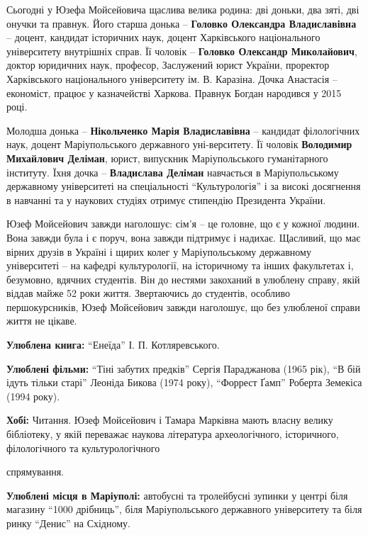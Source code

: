 Сьогодні у Юзефа Мойсейовича щаслива велика родина: дві доньки, два зяті, дві
онучки та правнук. Його старша донька – \textbf{Головко Олександра Владиславівна} –
доцент, кандидат історичних наук, доцент Харківського національного
університету внутрішніх справ. Її чоловік – \textbf{Головко Олександр Миколайович},
доктор юридичних наук, професор, Заслужений юрист України, проректор
Харківського національного університету ім. В. Каразіна. Дочка Анастасія –
економіст, працює у казначействі Харкова. Правнук Богдан народився у 2015 році.

Молодша донька – \textbf{Нікольченко Марія Владиславівна} – кандидат філологічних наук,
доцент Маріупольського державного уні\hyp{}верситету. Її чоловік \textbf{Володимир Михайлович
Деліман}, юрист, випускник Маріупольського гуманітарного інституту. Їхня дочка –
\textbf{Владислава Деліман} навчається в Маріупольському державному університеті на
спеціальності \enquote{Культурологія} і за високі досягнення в навчанні та у наукових
студіях отримує стипендію Президента України.


Юзеф Мойсейович завжди наголошує: сім'я – це головне, що є у кожної людини.
Вона завжди була і є поруч, вона завжди підтримує і надихає. Щасливий, що має
вірних друзів в Україні і щирих колег у Маріупольському державному університеті
– на кафедрі культурології, на історичному та інших факультетах і, безумовно,
вдячних студентів. Він до нестями закоханий в улюблену справу, якій віддав
майже 52 роки життя. Звертаючись до студентів, особливо першокурсників, Юзеф
Мойсейович завжди наголошує, що без улюбленої справи життя не цікаве.

\textbf{Улюблена книга:} \enquote{Енеїда} І. П. Котляревського.

\textbf{Улюблені фільми:} \enquote{Тіні забутих предків} Сергія Параджанова (1965 рік), \enquote{В бій
ідуть тільки старі} Леоніда Бикова (1974 року), \enquote{Форрест Ґамп} Роберта Земекіса
(1994 року).

\textbf{Хобі:} Читання. Юзеф Мойсейович і Тамара Марківна мають власну велику
бібліотеку, у якій переважає наукова література археологічного, історичного,
філологічного та культурологічного\par\noindent спрямування.

\textbf{Улюблені місця в Маріуполі:} автобусні та тролейбусні зупинки у центрі біля
магазину \enquote{1000 дрібниць}, біля Маріупольського державного університету та біля
ринку \enquote{Денис} на Східному.

